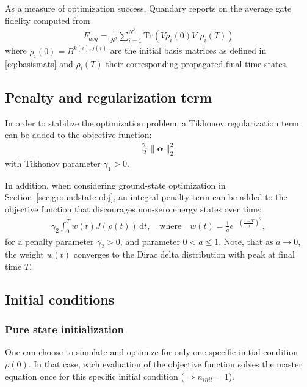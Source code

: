 \documentclass[11pt]{article}
\begin{document}
As a measure of optimization success, Quandary reports on the average gate fidelity computed from 
\begin{align}
  F_{avg} = \frac{1}{N^2} \sum_{i=1}^{N^2} \mbox{Tr}\left(V\rho_i(0)V^{\dagger}\rho_i(T) \right) 
\end{align}
where $\rho_i(0) = B^{k(i), j(i)}$ are the initial basis matrices as defined in \eqref{eq:basismats} and $\rho_i(T)$ their corresponding propagated final time states.

\subsection{Penalty and regularization term}
In order to stabilize the optimization problem, a Tikhonov regularization term can be added to the objective function:
\begin{align}
 \frac{\gamma_1}{2} \| \boldsymbol{\alpha} \|^2_2
\end{align}
with Tikhonov parameter $\gamma_1 > 0$.

In addition, when considering ground-state optimization in
Section~\ref{sec:groundstate-obj}, an integral penalty term can be added to the objective function that discourages non-zero energy states over time:
\begin{align}
  \gamma_2 \int_0^T w(t) J\left(\rho(t)\right) \, \mathrm{d}t, \quad \text{where} \quad w(t) =
  \frac{1}{a} e^{ -\left(\frac{t-T}{a} \right)^2},
\end{align}
for a penalty parameter $\gamma_2 > 0$, and parameter $0 < a \leq 1$. 
Note, that as $a\to 0$, the weight $w(t)$ converges to the Dirac delta
distribution with peak at final time $T$. 



\subsection{Initial conditions}\label{subsec:initcond}

\subsubsection{Pure state initialization}
One can choose to simulate and optimize for only one specific initial condition $\rho(0)$. In that case, each evaluation of the objective function solves the master equation once for this specific initial condition ($\Rightarrow n_{init} = 1$). 
\end{document}
